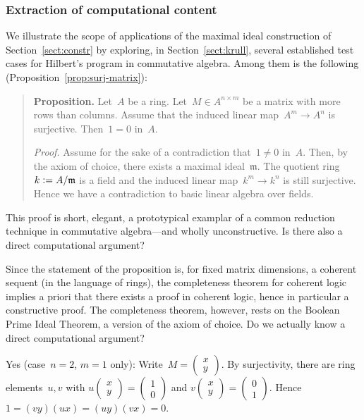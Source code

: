 \documentclass[envcountsect,envcountsame,runningheads]{llncs}
\newcommand{\mmm}{\mathfrak{m}}
\newcommand{\defeq}{\vcentcolon=}
\renewcommand{\_}{\mathpunct{.}\,}
\begin{document}
\subsubsection{Extraction of computational content} We illustrate the scope of
applications of the maximal ideal construction of Section~\ref{sect:constr} by
exploring, in Section~\ref{sect:krull}, several established test cases for
Hilbert's program in commutative algebra. Among them is the following
(Proposition~\ref{prop:surj-matrix}):
\begin{quote}\small
\textbf{Proposition.} Let~$A$ be a ring. Let~$M \in A^{n \times m}$ be a matrix with more rows
than columns. Assume that the induced linear map~$A^m \to A^n$ is surjective.
Then~$1 = 0$ in~$A$.
\smallskip

\emph{Proof.} Assume for the sake of a contradiction that~$1 \neq 0$ in~$A$.
Then, by the axiom of choice, there exists a maximal ideal~$\mmm$. The quotient
ring~$k \defeq A/\mmm$ is a field and the induced linear map~$k^m \to k^n$ is
still surjective. Hence we have a contradiction to basic linear algebra over fields.
\end{quote}
This proof is short, elegant, a prototypical examplar of a common reduction
technique in commutative algebra---and wholly unconstructive. Is there also a
direct computational argument?

Since the statement of the proposition is, for fixed matrix dimensions, a
coherent sequent (in the language of rings), the completeness
theorem for coherent logic implies a priori that there exists a proof in
coherent logic, hence in particular a constructive proof. The completeness
theorem, however, rests on the Boolean Prime Ideal Theorem, a version of the
axiom of choice. Do we actually know a direct computational argument?

Yes (case~$n = 2$, $m = 1$ only): Write~$M =
\left(\begin{smallmatrix}x\\y\end{smallmatrix}\right)$. By surjectivity,
there are ring elements~$u, v$ with
$
  u \left(\begin{smallmatrix}x\\y\end{smallmatrix}\right) = \left(\begin{smallmatrix}1\\0\end{smallmatrix}\right)
$
and
$
  v \left(\begin{smallmatrix}x\\y\end{smallmatrix}\right) = \left(\begin{smallmatrix}0\\1\end{smallmatrix}\right)
$.
Hence $1 = (vy) (ux) = (uy) (vx) = 0$.
\end{document}
